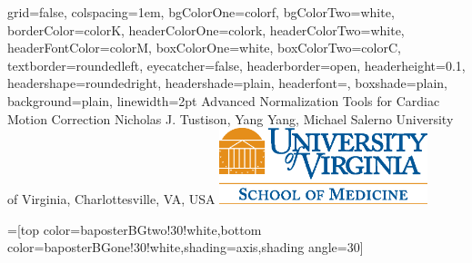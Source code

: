 \documentclass[paperwidth=48in,paperheight=48in,portrait,final]{baposter}
\begin{document}
\begin{poster}%
  {
  grid=false,
  colspacing=1em,
  bgColorOne=colorf,
  bgColorTwo=white,
  borderColor=colorK,
  headerColorOne=colork,
  headerColorTwo=white,
  headerFontColor=colorM,
  boxColorOne=white,
  boxColorTwo=colorC,
  textborder=roundedleft,
  eyecatcher=false,
  headerborder=open,
  headerheight=0.1\textheight,
  headershape=roundedright,
  headershade=plain,
  headerfont=\Large\textsf, %
  boxshade=plain,
  background=plain,
  linewidth=2pt
  }
  {} %
  {%
  Advanced Normalization Tools for Cardiac Motion Correction
  \vspace{5mm}
  }
  { %
  Nicholas J. Tustison, Yang Yang, Michael Salerno\newline
  {\smaller University of Virginia, Charlottesville, VA, USA}
  }
  { 
  \includegraphics[height=6em]{uvalogo}
  }

  =[top color=baposterBGtwo!30!white,bottom color=baposterBGone!30!white,shading=axis,shading angle=30]

     \newlength{\leftimgwidth}
     \setlength{\leftimgwidth}{0.78em+8.0em}





\end{poster}
\end{document}
